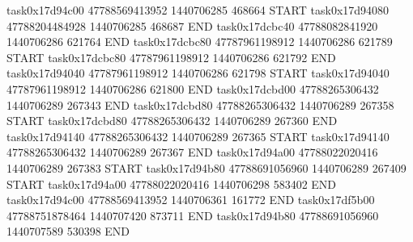 task0x17d94c00 47788569413952          1440706285               468664  START
task0x17d94080 47788204484928          1440706285               468687  END
task0x17dcbc40 47788082841920          1440706286               621764  END
task0x17dcbc80 47787961198912          1440706286               621789  START
task0x17dcbc80 47787961198912          1440706286               621792  END
task0x17d94040 47787961198912          1440706286               621798  START
task0x17d94040 47787961198912          1440706286               621800  END
task0x17dcbd00 47788265306432          1440706289               267343  END
task0x17dcbd80 47788265306432          1440706289               267358  START
task0x17dcbd80 47788265306432          1440706289               267360  END
task0x17d94140 47788265306432          1440706289               267365  START
task0x17d94140 47788265306432          1440706289               267367  END
task0x17d94a00 47788022020416          1440706289               267383  START
task0x17d94b80 47788691056960          1440706289               267409  START
task0x17d94a00 47788022020416          1440706298               583402  END
task0x17d94c00 47788569413952          1440706361               161772  END
task0x17df5b00 47788751878464          1440707420               873711  END
task0x17d94b80 47788691056960          1440707589               530398  END
 